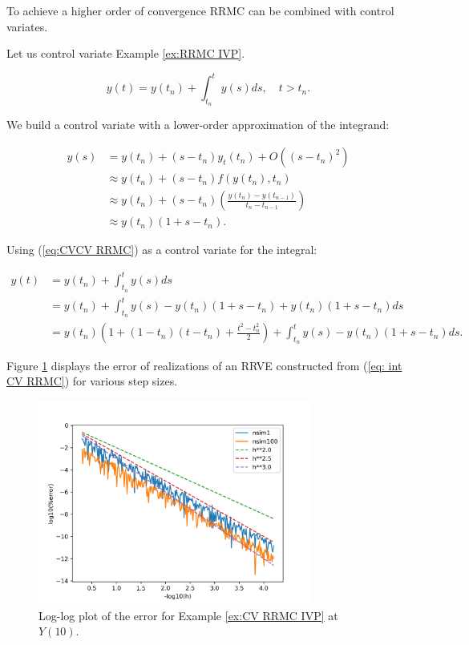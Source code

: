 \documentclass[a4paper,12pt]{article}
\begin{document}
To achieve a higher order of convergence RRMC can be combined with control variates.
\begin{example}[CV RRMC $y_t=y$]\label{ex:CV RRMC IVP}
    Let us control variate Example \ref{ex:RRMC IVP}.

    \begin{equation}
        y(t)= y(t_{n}) + \int_{t_{n}}^{t}y(s)ds , \quad t>t_{n}.
    \end{equation}

    We build a control variate with a lower-order approximation
    of the integrand:

    \begin{align}
        y(s) & = y(t_{n}) + (s-t_{n})y_t(t_{n}) + O((s-t_{n})^{2})      \\
             & \approx y(t_{n}) + (s-t_{n})f(y(t_{n}),t_{n})            \\
             & \approx y(t_{n}) +
        (s-t_{n})\left(\frac{y(t_{n})-y(t_{n-1})}{t_{n}-t_{n-1}}\right) \\
             & \approx y(t_{n})(1+s-t_{n}). \label{eq:CVCV RRMC}
    \end{align}

    Using (\ref{eq:CVCV RRMC}) as a control variate for the integral:

    \begin{align}
        y(t) & = y(t_{n}) + \int_{t_{n}}^{t}y(s)ds                                          \\
             & = y(t_{n}) + \int_{t_{n}}^{t}y(s)-y(t_{n})(1+s-t_{n}) +y(t_{n})(1+s-t_{n})ds \\
             & = y(t_{n})\left(1 + (1-t_{n})(t-t_{n})+\frac{t^{2}-t_{n}^{2}}{2}\right)
        + \int_{t_{n}}^{t}y(s)-y(t_{n})(1+s-t_{n})ds. \label{eq: int CV RRMC}
    \end{align}

    Figure \ref{fig:CV RRMC IVP} displays the error
    of realizations of an RRVE constructed from (\ref{eq: int CV RRMC})
    for various step sizes.

    \begin{figure}[h!]
        \centering
        \includegraphics[width=0.8\textwidth]{plots/CV RRMC IVP.png}
        \caption{Log-log plot of the error for Example
            \ref{ex:CV RRMC IVP} at $Y(10)$.}
        \label{fig:CV RRMC IVP}
    \end{figure}
\end{example}
\end{document}
